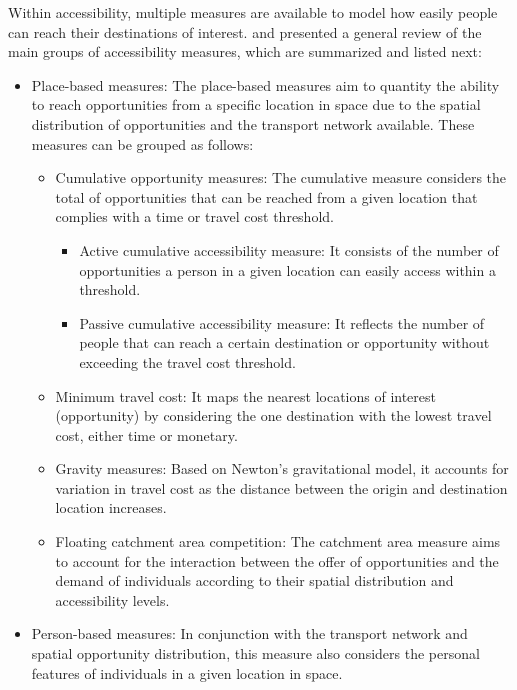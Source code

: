 \documentclass[12pt, a4paper]{report}
\begin{document}

Within accessibility, multiple measures are available to model how easily people can reach their destinations of interest. \cite{paezMeasuringAccessibilityPositive2012} and \cite{dijstOpportunitiesTransportMode2002} presented a general review of the main groups of accessibility measures, which are summarized and listed next:

\begin{itemize}
  \item Place-based measures: The place-based measures aim to quantity the ability to reach opportunities from a specific location in space due to the spatial distribution of opportunities and the transport network available. These measures can be grouped as follows:
    \begin{itemize}
        \item Cumulative opportunity measures: The cumulative measure considers the total of opportunities that can be reached from a given location that complies with a time or travel cost threshold.
            \begin{itemize}
                \item Active cumulative accessibility measure: It consists of the number of opportunities a person in a given location can easily access within a threshold. 
                \item Passive cumulative accessibility measure: It reflects the number of people that can reach a certain destination or opportunity without exceeding the travel cost threshold.
            \end{itemize}
        \item Minimum travel cost: It maps the nearest locations of interest (opportunity) by considering the one destination with the lowest travel cost, either time or monetary.
        \item Gravity measures: Based on Newton's gravitational model, it accounts for variation in travel cost as the distance between the origin and destination location increases.
        \item Floating catchment area competition: The catchment area measure aims to account for the interaction between the offer of opportunities and the demand of individuals according to their spatial distribution and accessibility levels.
        
    \end{itemize}
  \item Person-based measures: In conjunction with the transport network and spatial opportunity distribution, this measure also considers the personal features of individuals in a given location in space.
\end{itemize}
\end{document}

